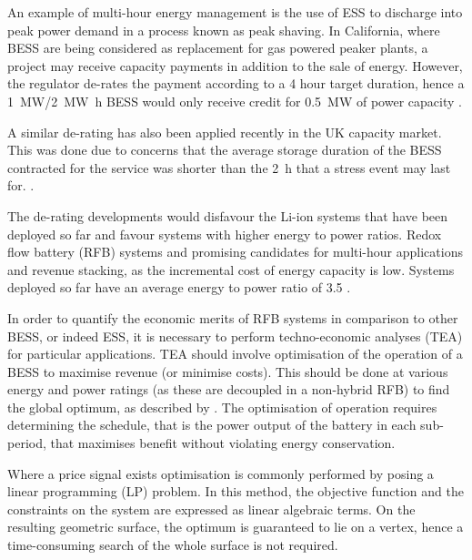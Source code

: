 \documentclass[preprint,3p,review,authoryear,10pt]{elsarticle}
\begin{document}
An example of multi-hour energy management is the use of ESS to discharge into peak power demand in a process known as peak shaving. In California, where BESS are being considered as replacement for gas powered peaker plants, a project may receive capacity payments in addition to the sale of energy. However, the regulator de-rates the payment according to a 4 hour target duration, hence a \SI{1}{\mega\watt}/\SI{2}{\mega\watt\hour} BESS would only receive credit for  \SI{0.5}{\mega\watt} of power capacity \cite{NRELPeakingESS}. 

A similar de-rating has also been applied recently in the UK capacity market. This was done due to concerns that the average storage duration of the BESS contracted for the service was shorter than the \SI{2}{\hour} that a stress event may last for. \cite{NGDeratingFactors}. 

The de-rating developments would disfavour the Li-ion systems that have been deployed so far and favour systems with higher energy to power ratios. Redox flow battery (RFB) systems and promising candidates for multi-hour applications and revenue stacking, as the incremental cost of energy capacity is low. Systems deployed so far have an average energy to power ratio of 3.5 \cite{Newbery2018}.

In order to quantify the economic merits of RFB systems in comparison to other BESS, or indeed ESS, it is necessary to perform techno-economic analyses (TEA) for particular applications. TEA should involve optimisation of the operation of a BESS to maximise revenue (or minimise costs). This should be done at various energy and power ratings (as these are decoupled in a non-hybrid RFB) to find the global optimum, as described by \cite{Oudalov2007}. The optimisation of operation requires determining the schedule, that is the power output of the battery in each sub-period, that maximises benefit without violating energy conservation.

Where a price signal exists optimisation is commonly performed by posing a linear programming (LP) problem. In this method, the objective function and the constraints on the system are expressed as linear algebraic terms. On the resulting geometric surface, the optimum is guaranteed to lie on a vertex, hence a time-consuming search of the whole surface is not required.
\end{document}
